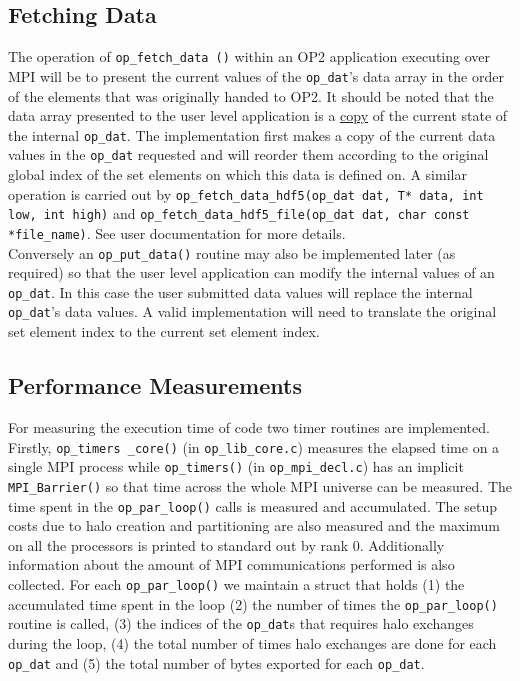 \documentclass[11pt]{article}
\begin{document}
\subsection{Fetching Data}\label{subsec/putfetch}
The operation of \texttt{op\_fetch\_data ()} within an OP2 application executing over MPI will be to present the current
values of the \texttt{op\_dat}'s data array in the order of the elements that was originally handed to OP2. It should be
noted that the data array presented to the user level application is a \underline{copy} of the current state of the
internal \texttt{op\_dat}. The implementation first makes a copy of the current data values in the \texttt{op\_dat}
requested and will reorder them according to the original global index of the set elements on which this data is defined
on. A similar operation is carried out by \texttt{op\_fetch\_data\_hdf5(op\_dat dat, T* data, int low, int high)} and
\texttt{op\_fetch\_data\_hdf5\_file(op\_dat dat, char const *file\_name)}. See user documentation for more details. \\

\noindent Conversely an \texttt{op\_put\_data()} routine may also be implemented later (as required) so that the user
level application can modify the internal values of an \texttt{op\_dat}. In this case the user submitted data values
will replace the internal \texttt{op\_dat}'s data values. A valid implementation will need to translate the original set
element index to the current set element index.


\subsection{Performance Measurements}\label{subsec/perf}

For measuring the execution time of code two timer routines are implemented. Firstly, \texttt{op\_timers \_core()} (in
\texttt{op\_lib\_core.c}) measures the elapsed time on a single MPI process while \texttt{op\_timers()}
(in \texttt{op\_mpi\_decl.c}) has an implicit \texttt{MPI\_Barrier()} so that time across the whole MPI universe can be
measured. \noindent The time spent in the \texttt{op\_par\_loop()} calls is measured and accumulated. The setup costs
due to halo creation and partitioning are also measured and the maximum on all the processors is printed to standard out
by rank 0. Additionally information about the amount of MPI communications performed is also collected. For each
\texttt{op\_par\_loop()} we maintain a struct that holds (1) the accumulated time spent in the loop (2) the number of
times the \texttt{op\_par\_loop()} routine is called, (3) the indices of the \texttt{op\_dat}s that requires halo
exchanges during the loop, (4) the total number of times halo exchanges are done for each \texttt{op\_dat} and (5) the
total number of bytes exported for each \texttt{op\_dat}.
\end{document}
